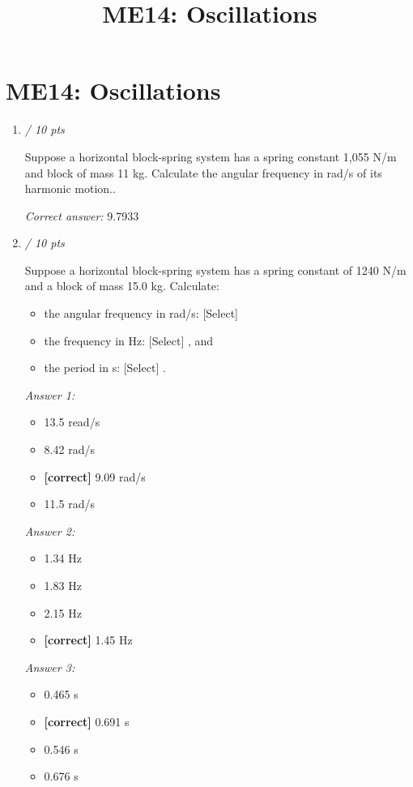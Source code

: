 \documentclass[11pt]{article}
\title{ME14: Oscillations}
\author{}
\date{}
\begin{document}
\maketitle

\section*{ME14: Oscillations}

\begin{enumerate}[leftmargin=*,label=\textbf{Question \arabic*.}]
\item \hfill \textit{/ 10 pts}

Suppose a horizontal block-spring system has a spring constant 1,055 N/m and block of mass 11 kg. Calculate the angular frequency in rad/s of its harmonic motion..

\textit{Correct answer: } 9.7933

\item \hfill \textit{/ 10 pts}

Suppose a horizontal block-spring system has a spring constant of 1240 N/m and a block of mass 15.0 kg. Calculate:

\begin{itemize}

\item the angular frequency in rad/s: [Select]

\item the frequency in Hz: [Select]
, and

\item the period in s: [Select]
.

\end{itemize}

\textit{Answer 1:}
\begin{itemize}
  \item 13.5 read/s
  \item 8.42 rad/s
  \item \textbf{[correct]} 9.09 rad/s
  \item 11.5 rad/s
\end{itemize}
\textit{Answer 2:}
\begin{itemize}
  \item 1.34 Hz
  \item 1.83 Hz
  \item 2.15 Hz
  \item \textbf{[correct]} 1.45 Hz
\end{itemize}
\textit{Answer 3:}
\begin{itemize}
  \item 0.465 s
  \item \textbf{[correct]} 0.691 s
  \item 0.546 s
  \item 0.676 s
\end{itemize}


\end{enumerate}
\end{document}
